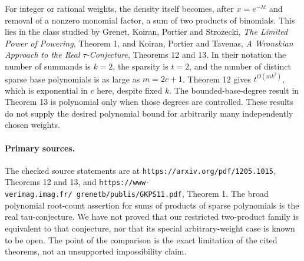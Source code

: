 \documentclass[11pt]{article}
\begin{document}
For integer or rational weights, the density itself becomes, after
$x=e^{-\lambda t}$ and removal of a nonzero monomial factor, a sum of
two products of binomials. This lies in the class studied by
Grenet, Koiran, Portier and Strozecki, \emph{The Limited Power of
Powering}, Theorem 1, and Koiran, Portier and Tavenas,
\emph{A Wronskian Approach to the Real $\tau$-Conjecture},
Theorems 12 and 13. In their notation the number of summands is $k=2$,
the sparsity is $t=2$, and the number of distinct sparse base
polynomials is as large as $m=2c+1$. Theorem 12 gives
$t^{O(mk^2)}$, which is exponential in $c$ here, despite fixed $k$.
The bounded-base-degree result in Theorem 13 is polynomial only when
those degrees are controlled. These results do not supply the desired
polynomial bound for arbitrarily many independently chosen weights.

\paragraph{Primary sources.}
The checked source statements are at
\texttt{https://arxiv.org/pdf/1205.1015}, Theorems 12 and 13,
and \texttt{https://www-verimag.imag.fr/\string~grenetb/publis/GKPS11.pdf},
Theorem 1. The broad polynomial root-count assertion for sums of
products of sparse polynomials is the real tau-conjecture. We have not
proved that our restricted two-product family is equivalent to that
conjecture, nor that its special arbitrary-weight case is known to be
open. The point of the comparison is the exact limitation of the cited
theorems, not an unsupported impossibility claim.
\end{document}
